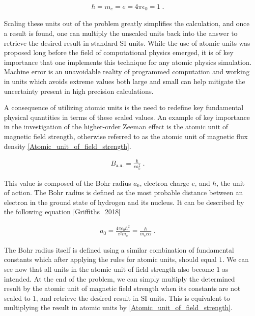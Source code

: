         \begin{align}
            \hbar = m_e = e = 4\pi \epsilon_0 = 1\;.
        \end{align}

        \noindent Scaling these units out of the problem greatly simplifies the calculation, and once a result is found, one can multiply the unscaled units back into the answer to retrieve the desired result in standard SI units. While the use of atomic units was proposed long before the field of computational physics emerged, it is of key importance that one implements this technique for any atomic physics simulation. Machine error is an unavoidable reality of programmed computation and working in units which avoids extreme values both large and small can help mitigate the uncertainty present in high precision calculations.

        A consequence of utilizing atomic units is the need to redefine key fundamental physical quantities in terms of these scaled values. An example of key importance in the investigation of the higher-order Zeeman effect is the atomic unit of magnetic field strength, otherwise referred to as the atomic unit of magnetic flux density \ref{Atomic_unit_of_field_strength}.

        \begin{align}
            B_{\text{a.u.}} = \frac{\hbar}{e a_0^2}\;.
        \end{align}

        This value is composed of the Bohr radius $a_0$, electron charge $e$, and $\hbar$, the unit of action. The Bohr radius is defined as the most probable distance between an electron in the ground state of hydrogen and its nucleus. It can be described by the following equation \ref{Griffiths_2018}

        \begin{align}
            a_0 = \frac{4\pi \epsilon_0 \hbar^2}{e^2 m_e} = \frac{\hbar}{m_e c \alpha} \label{eq:bohr_radius}\;.
        \end{align}

        The Bohr radius itself is defined using a similar combination of fundamental constants which after applying the rules for atomic units, should equal $1$. We can see now that all units in the atomic unit of field strength also become $1$ as intended. At the end of the problem, we can simply multiply the determined result by the atomic unit of magnetic field strength when its constants are not scaled to $1$, and retrieve the desired result in SI units. This is equivalent to multiplying the result in atomic units by \ref{Atomic_unit_of_field_strength}.

